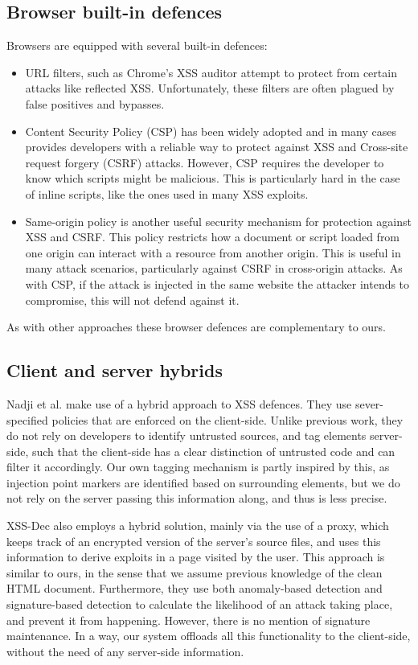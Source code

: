 \subsection{Browser built-in defences}
Browsers are equipped with several built-in defences:
\begin{itemize}
	\item  URL filters, such as Chrome's XSS auditor attempt to protect from certain attacks like reflected XSS. Unfortunately, these filters are often plagued by false positives and bypasses.
	\item Content Security Policy (CSP) \cite{CSP} has been widely adopted and in many cases provides developers with a reliable way to protect against XSS and Cross-site request forgery (CSRF) attacks. However, CSP requires the developer to know which scripts might be malicious. This is particularly hard in the case of inline scripts, like the ones used in many XSS exploits.
	\item Same-origin policy \cite{SOP} is another useful security mechanism for protection against XSS and CSRF. This policy restricts how a document or script loaded from one origin can interact with a resource from another origin. This is useful in many attack scenarios, particularly against CSRF in cross-origin attacks. As with CSP, if the attack is injected in the same website the attacker intends to compromise, this will not defend against it.
\end{itemize}

As with other approaches these browser defences are complementary to ours.

\subsection{Client and server hybrids}
Nadji et al. \cite{Nadji:2009} make use of a hybrid approach to XSS defences. They use sever-specified policies that are enforced on the client-side. Unlike previous work, they do not rely on developers to identify untrusted sources, and tag elements server-side, such that the client-side has a clear distinction of untrusted code and can filter it accordingly. Our own tagging mechanism is partly inspired by this, as injection point markers are identified based on surrounding elements, but we do not rely on the server passing this information along, and thus is less precise.
 
XSS-Dec \cite{10.1007/978-3-642-31540-4_17} also employs a hybrid solution, mainly via the use of a proxy, which keeps track of an encrypted version of the server's source files, and uses this information to derive exploits in a page visited by the user. This approach is similar to ours, in the sense that we assume previous knowledge of the clean HTML document. Furthermore, they use both anomaly-based detection and signature-based detection to calculate the likelihood of an attack taking place, and prevent it from happening. However, there is no mention of signature maintenance. In a way, our system offloads all this functionality to the client-side, without the need of any server-side information.

